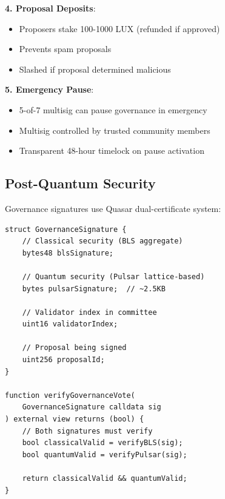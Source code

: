 \textbf{4. Proposal Deposits}:
\begin{itemize}
\item Proposers stake 100-1000 LUX (refunded if approved)
\item Prevents spam proposals
\item Slashed if proposal determined malicious
\end{itemize}

\textbf{5. Emergency Pause}:
\begin{itemize}
\item 5-of-7 multisig can pause governance in emergency
\item Multisig controlled by trusted community members
\item Transparent 48-hour timelock on pause activation
\end{itemize}

\subsection{Post-Quantum Security}

Governance signatures use Quasar dual-certificate system:

\begin{lstlisting}[language=Solidity,caption=Quantum-secure governance signature]
struct GovernanceSignature {
    // Classical security (BLS aggregate)
    bytes48 blsSignature;

    // Quantum security (Pulsar lattice-based)
    bytes pulsarSignature;  // ~2.5KB

    // Validator index in committee
    uint16 validatorIndex;

    // Proposal being signed
    uint256 proposalId;
}

function verifyGovernanceVote(
    GovernanceSignature calldata sig
) external view returns (bool) {
    // Both signatures must verify
    bool classicalValid = verifyBLS(sig);
    bool quantumValid = verifyPulsar(sig);

    return classicalValid && quantumValid;
}
\end{lstlisting}

